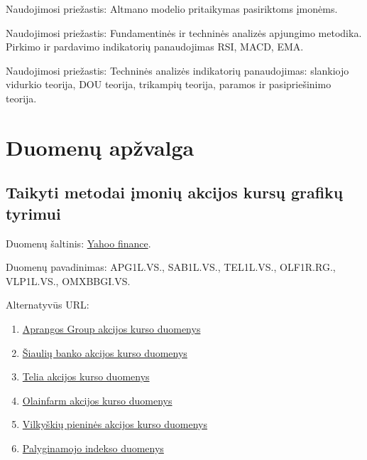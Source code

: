 \documentclass[titlepage, 11pt]{article}
\begin{document}
Naudojimosi priežastis: Altmano modelio pritaikymas pasiriktoms įmonėms.

Naudojimosi priežastis: Fundamentinės ir techninės analizės apjungimo metodika. Pirkimo ir pardavimo indikatorių panaudojimas RSI, MACD, EMA.

Naudojimosi priežastis: Techninės analizės indikatorių panaudojimas: slankiojo vidurkio teorija, DOU teorija, trikampių teorija, paramos ir pasipriešinimo teorija.

\section{Duomenų apžvalga}

\subsection{Taikyti metodai įmonių akcijos kursų grafikų tyrimui}
Duomenų šaltinis: \href{https://finance.yahoo.com/}{Yahoo finance}.

Duomenų pavadinimas: APG1L.VS., SAB1L.VS., TEL1L.VS., OLF1R.RG., VLP1L.VS., OMXBBGI.VS.

Alternatyvūs URL:
\begin{enumerate}
\item \href{https://finance.yahoo.com/quote/APG1L.VS?p=APG1L.VS&.tsrc=fin-srch}{Aprangos Group akcijos kurso duomenys}

\item\href{https://finance.yahoo.com/quote/SAB1L.VS?p=SAB1L.VS&.tsrc=fin-srch}{Šiaulių banko akcijos kurso duomenys}

\item\href{https://finance.yahoo.com/quote/TEL1L.VS?p=TEL1L.VS&.tsrc=fin-srch}{Telia akcijos kurso duomenys}

\item\href{https://finance.yahoo.com/quote/OLF1R.RG?p=OLF1R.RG&.tsrc=fin-srch}{Olainfarm akcijos kurso duomenys}

\item\href{https://finance.yahoo.com/quote/VLP1L.VS?p=VLP1L.VS}{Vilkyškių pieninės akcijos kurso duomenys}

\item\href{https://finance.yahoo.com/quote/\%5EOMXBBGI/}{Palyginamojo indekso duomenys}
\end{enumerate}
\end{document}
